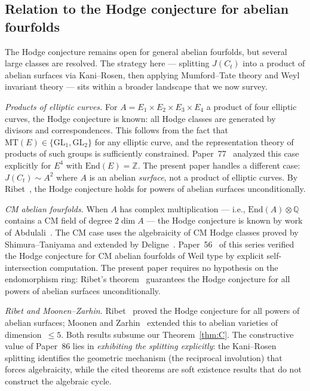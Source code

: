 \documentclass[11pt]{article}
\theoremstyle{plain}
\theoremstyle{definition}
\theoremstyle{remark}
\newcommand{\Z}{\mathbb{Z}}
\newcommand{\Q}{\mathbb{Q}}
\newcommand{\GL}{\mathrm{GL}}
\newcommand{\End}{\mathrm{End}}
\newcommand{\MT}{\mathrm{MT}}
\begin{document}
\subsection{Relation to the Hodge conjecture for abelian fourfolds}

The Hodge conjecture remains open for general abelian fourfolds,
but several large classes are resolved.  The strategy here ---
splitting $J(C_t)$ into a product of abelian surfaces via
Kani--Rosen, then applying Mumford--Tate theory and Weyl
invariant theory --- sits within a broader landscape that we
now survey.

\emph{Products of elliptic curves.}
For $A = E_1 \times E_2 \times E_3 \times E_4$ a product of four
elliptic curves, the Hodge conjecture is known: all Hodge classes
are generated by divisors and correspondences.  This follows from
the fact that $\MT(E) \in \{\GL_1, \GL_2\}$ for any elliptic curve,
and the representation theory of products of such groups is
sufficiently constrained.  Paper~77~\cite{P77} analyzed this case
explicitly for $E^4$ with $\End(E) = \Z$.  The present paper handles
a different case: $J(C_t) \sim A^2$ where $A$ is an abelian
\emph{surface}, not a product of elliptic curves.
By Ribet~\cite{Ribet83}, the Hodge conjecture holds for
powers of abelian surfaces unconditionally.

\emph{CM abelian fourfolds.}
When $A$ has complex multiplication --- i.e., $\End(A) \otimes \Q$
contains a CM field of degree $2\dim A$ --- the Hodge conjecture
is known by work of Abdulali~\cite{Abdulali94}.  The CM case uses
the algebraicity of CM Hodge classes proved by Shimura--Taniyama
and extended by Deligne~\cite{Deligne82}.  Paper~56~\cite{P56}
of this series verified the Hodge conjecture for CM abelian
fourfolds of Weil type by explicit self-intersection computation.
The present paper requires no hypothesis on the endomorphism ring:
Ribet's theorem~\cite{Ribet83} guarantees the Hodge conjecture for
all powers of abelian surfaces unconditionally.

\emph{Ribet and Moonen--Zarhin.}
Ribet~\cite{Ribet83} proved the Hodge conjecture for all powers
of abelian surfaces; Moonen and Zarhin~\cite{MZ99} extended this to
abelian varieties of dimension~$\leq 5$.  Both results subsume
our Theorem~\ref{thm:C}.  The constructive value of Paper~86
lies in \emph{exhibiting the splitting explicitly}: the Kani--Rosen
splitting identifies the geometric mechanism (the reciprocal
involution) that forces algebraicity, while the cited theorems are
soft existence results that do not construct the algebraic cycle.
\end{document}
